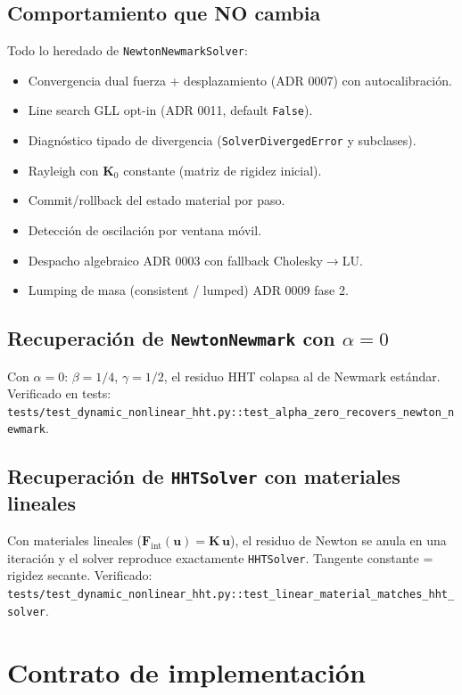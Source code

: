 \documentclass[11pt,letterpaper,oneside]{report}
\begin{document}
\subsection{Comportamiento que NO cambia}

Todo lo heredado de \texttt{NewtonNewmarkSolver}:

\begin{itemize}
  \item Convergencia dual fuerza + desplazamiento (ADR 0007) con autocalibración.
  \item Line search GLL opt-in (ADR 0011, default \texttt{False}).
  \item Diagnóstico tipado de divergencia (\texttt{SolverDivergedError} y subclases).
  \item Rayleigh con $\mathbf K_0$ constante (matriz de rigidez inicial).
  \item Commit/rollback del estado material por paso.
  \item Detección de oscilación por ventana móvil.
  \item Despacho algebraico ADR 0003 con fallback Cholesky\ensuremath{\to}LU.
  \item Lumping de masa (consistent / lumped) ADR 0009 fase 2.
\end{itemize}

\subsection{Recuperación de \texttt{NewtonNewmark} con $\alpha = 0$}

Con $\alpha = 0$: $\beta = 1/4$, $\gamma = 1/2$, el residuo HHT colapsa al
de Newmark estándar. Verificado en tests:
\texttt{tests/test\_dynamic\_nonlinear\_hht.py::test\_alpha\_zero\_recovers\_newton\_newmark}.

\subsection{Recuperación de \texttt{HHTSolver} con materiales lineales}

Con materiales lineales ($\mathbf F_{\text{int}}(\mathbf u) = \mathbf K\,\mathbf u$),
el residuo de Newton se anula en una iteración y el solver reproduce
exactamente \texttt{HHTSolver}. Tangente constante = rigidez secante. Verificado:
\texttt{tests/test\_dynamic\_nonlinear\_hht.py::test\_linear\_material\_matches\_hht\_solver}.


\section{Contrato de implementación}
\end{document}
